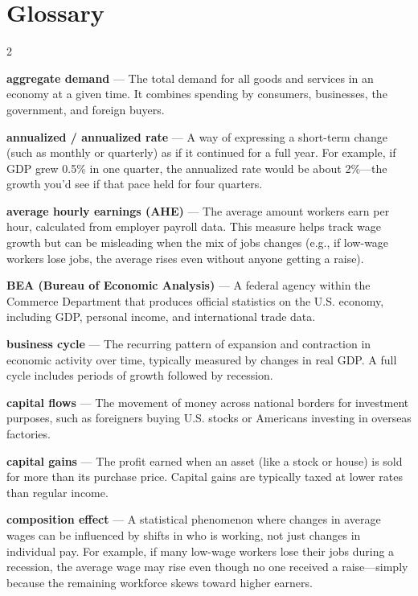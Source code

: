 
\section*{Glossary}


\begin{multicols}{2}
\small
\setlength{\parindent}{0pt}
\setlength{\parskip}{0.5\baselineskip}

\textbf{aggregate demand} --- The total demand for all goods and services in an economy at a given time. It combines spending by consumers, businesses, the government, and foreign buyers.

\textbf{annualized / annualized rate} --- A way of expressing a short-term change (such as monthly or quarterly) as if it continued for a full year. For example, if GDP grew 0.5\% in one quarter, the annualized rate would be about 2\%---the growth you'd see if that pace held for four quarters.

\textbf{average hourly earnings (AHE)} --- The average amount workers earn per hour, calculated from employer payroll data. This measure helps track wage growth but can be misleading when the mix of jobs changes (e.g., if low-wage workers lose jobs, the average rises even without anyone getting a raise).

\textbf{BEA (Bureau of Economic Analysis)} --- A federal agency within the Commerce Department that produces official statistics on the U.S. economy, including GDP, personal income, and international trade data.

\textbf{business cycle} --- The recurring pattern of expansion and contraction in economic activity over time, typically measured by changes in real GDP. A full cycle includes periods of growth followed by recession.

\textbf{capital flows} --- The movement of money across national borders for investment purposes, such as foreigners buying U.S. stocks or Americans investing in overseas factories.

\textbf{capital gains} --- The profit earned when an asset (like a stock or house) is sold for more than its purchase price. Capital gains are typically taxed at lower rates than regular income.

\textbf{composition effect} --- A statistical phenomenon where changes in average wages can be influenced by shifts in who is working, not just changes in individual pay. For example, if many low-wage workers lose their jobs during a recession, the average wage may rise even though no one received a raise---simply because the remaining workforce skews toward higher earners.


\end{multicols}
